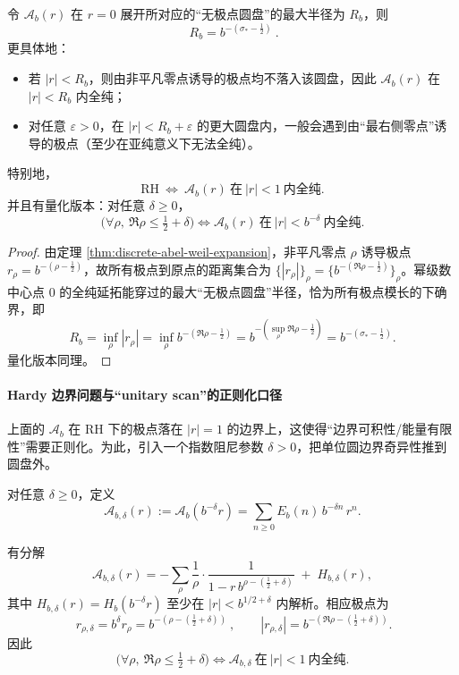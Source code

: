 \begin{theorem}[解析半径刻画最右零点实部]\label{thm:radius-captures-sigma-star}
令 \(\mathcal A_b(r)\) 在 \(r=0\) 展开所对应的“无极点圆盘”的最大半径为 \(R_b\)，则
\[
\boxed{\ R_b=b^{-(\sigma_*-\frac12)}\ }.
\]
更具体地：
\begin{itemize}
\item 若 \(|r|<R_b\)，则由非平凡零点诱导的极点均不落入该圆盘，因此 \(\mathcal A_b(r)\) 在 \(|r|<R_b\) 内全纯；
\item 对任意 \(\varepsilon>0\)，在 \(|r|<R_b+\varepsilon\) 的更大圆盘内，一般会遇到由“最右侧零点”诱导的极点（至少在亚纯意义下无法全纯）。
\end{itemize}
特别地，
\[
\boxed{\ \mathrm{RH}\ \Longleftrightarrow\ \mathcal A_b(r)\ \text{在}\ |r|<1\ \text{内全纯}.\ }
\]
并且有量化版本：对任意 \(\delta\ge 0\)，
\[
\boxed{\ \bigl(\forall\rho,\ \Re\rho\le\tfrac12+\delta\bigr)
\Longleftrightarrow
\mathcal A_b(r)\ \text{在}\ |r|<b^{-\delta}\ \text{内全纯}.\ }
\]
\end{theorem}
\begin{proof}
由定理 \ref{thm:discrete-abel-weil-expansion}，非平凡零点 \(\rho\) 诱导极点 \(r_\rho=b^{-(\rho-\frac12)}\)，故所有极点到原点的距离集合为 \(\{|r_\rho|\}_\rho=\{b^{-(\Re\rho-\frac12)}\}_\rho\)。幂级数中心点 \(0\) 的全纯延拓能穿过的最大“无极点圆盘”半径，恰为所有极点模长的下确界，即
\[
R_b=\inf_\rho |r_\rho|=\inf_\rho b^{-(\Re\rho-\frac12)}=b^{-(\sup_\rho \Re\rho-\frac12)}=b^{-(\sigma_*-\frac12)}.
\]
量化版本同理。
\end{proof}

\paragraph{Hardy 边界问题与“unitary scan”的正则化口径}
上面的 \(\mathcal A_b\) 在 RH 下的极点落在 \(|r|=1\) 的边界上，这使得“边界可积性/能量有限性”需要正则化。为此，引入一个指数阻尼参数 \(\delta>0\)，把单位圆边界奇异性推到圆盘外。

\begin{definition}\label{def:Abel-damped}
对任意 \(\delta\ge 0\)，定义
\[
\boxed{\ \mathcal A_{b,\delta}(r):=\mathcal A_b(b^{-\delta}r)=\sum_{n\ge 0}E_b(n)\,b^{-\delta n}\,r^n.\ }
\]
\end{definition}

\begin{proposition}[阻尼后的极点位置]\label{prop:damped-poles}
有分解
\[
\mathcal A_{b,\delta}(r)
=-\sum_{\rho}\frac{1}{\rho}\cdot\frac{1}{1-r\,b^{\rho-(\frac12+\delta)}}\;+\;H_{b,\delta}(r),
\]
其中 \(H_{b,\delta}(r)=H_b(b^{-\delta}r)\) 至少在 \(|r|<b^{1/2+\delta}\) 内解析。相应极点为
\[
\boxed{\ r_{\rho,\delta}=b^{\delta}r_\rho=b^{-(\rho-(\frac12+\delta))}\ },\qquad
|r_{\rho,\delta}|=b^{-(\Re\rho-(\frac12+\delta))}.
\]
因此
\[
\bigl(\forall\rho,\ \Re\rho\le\tfrac12+\delta\bigr)
\Longleftrightarrow
\mathcal A_{b,\delta}\ \text{在}\ |r|<1\ \text{内全纯}.
\]
\end{proposition}

